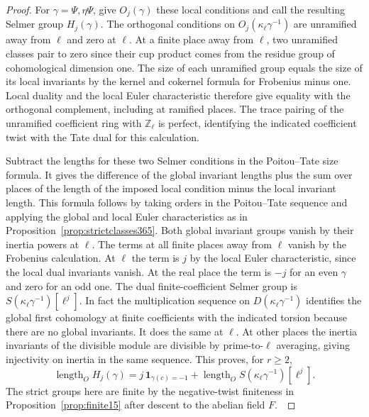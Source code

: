 \documentclass[a4paper,11pt]{article}
\theoremstyle{definition}
\theoremstyle{remark}
\newcommand{\ZZ}{\mathbb Z}\newcommand{\ord}{\operatorname{ord}}
\newcommand{\len}{\operatorname{length}}\newcommand{\Res}{\operatorname*{Res}}
\numberwithin{equation}{section}
\begin{document}
\begin{proof}
For \(\gamma=\Psi,\eta\Psi\), give \(O_j(\gamma)\) these local
conditions and call the resulting Selmer group \(H_j(\gamma)\).
The orthogonal conditions on \(O_j(\kappa_\ell\gamma^{-1})\)
are unramified away from \(\ell\) and zero at \(\ell\).
At a finite place away from \(\ell\), two unramified classes
pair to zero since their cup product comes from the residue
group of cohomological dimension one. The size of each
unramified group equals the size of its local invariants
by the kernel and cokernel formula for Frobenius minus one.
Local duality and the local Euler characteristic therefore
give equality with the orthogonal complement, including at
ramified places. The trace pairing of the unramified coefficient
ring with \(\ZZ_\ell\) is perfect, identifying the indicated
coefficient twist with the Tate dual for this calculation.

Subtract the lengths for these two Selmer conditions in
the Poitou--Tate size formula. It gives the difference of
the global invariant lengths plus the sum over places of
the length of the imposed local condition minus the local
invariant length. This formula follows by taking orders in
the Poitou--Tate sequence and applying the global and local
Euler characteristics as in Proposition~\ref{prop:strictclasses365}.
Both global invariant groups vanish by their inertia powers
at \(\ell\). The terms at all finite places away from \(\ell\)
vanish by the Frobenius calculation. At \(\ell\) the term is
\(j\) by the local Euler characteristic, since the local
dual invariants vanish. At the real place the term is \(-j\)
for an even \(\gamma\) and zero for an odd one. The dual
finite-coefficient Selmer group is
\(S(\kappa_\ell\gamma^{-1})[\ell^j]\). In fact the multiplication
sequence on \(D(\kappa_\ell\gamma^{-1})\) identifies the global
first cohomology at finite coefficients with the indicated
torsion because there are no global invariants. It does
the same at \(\ell\). At other places the inertia invariants
of the divisible module are divisible by prime-to-\(\ell\)
averaging, giving injectivity on inertia in the same sequence.
This proves, for \(r\ge2\),
\[
 \len_O H_j(\gamma)
    = j\,\mathbf1_{\gamma(c)=-1}
      +\len_O S(\kappa_\ell\gamma^{-1})[\ell^j].
\]
The strict groups here are finite by the negative-twist
finiteness in Proposition~\ref{prop:finite15} after descent
to the abelian field \(F\).~\cite{VIII-VI-V-milne98}


\end{proof}
\end{document}
